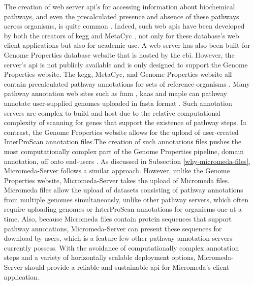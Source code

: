 The creation of web server \gls{api}'s for accessing information about 
biochemical pathways, and even the precalculated presence and absence of these 
pathways across organisms, is quite common 
\cite{wu2006kobas,moriya2010pathpred,pireddu2006path,vallenet2009microscope,aziz2008rast,takami2016automated,moriya2007kaas,chou2009fmm}. 
Indeed, such web \gls{api}s have been developed by both the creators of 
\gls{kegg} \cite{kawashima2003kegg} and MetaCyc \cite{karp2013data}, not only 
for these database's web client applications but also for academic use. A web 
server has also been built for Genome Properties database website 
\cite{richardson2018genome} that is hosted by the \gls{ebi}. However, the 
server's \gls{api} is not publicly available and is only designed to support the 
Genome Properties website. The \gls{kegg}, MetaCyc, and Genome Properties 
website all contain precalculated pathway annotations for sets of reference 
organisms \cite{kanehisa2000kegg,karp2002metacyc,karp2013data}. Many pathway 
annotation web sites such as \gls{fmm} \cite{chou2009fmm}, \gls{kaas} 
\cite{moriya2007kaas} and \gls{maple} \cite{takami2016automated} can pathway 
annotate user-supplied genomes uploaded in \gls{fasta} format 
\cite{pearson19905}. Such annotation servers are complex to build and host due 
to the relative computational complexity of scanning for genes that support the 
existence of pathway steps. In contrast, the Genome Properties website allows 
for the upload of user-created InterProScan annotation files.The creation of 
such annotations files pushes the most computationally complex part of the 
Genome Properties pipeline, domain annotation, off onto end-users 
\cite{richardson2018genome}. As discussed in Subsection 
\ref{why-micromeda-files}, Micromeda-Server follows a similar approach. However, 
unlike the Genome Properties website, Micromeda-Server takes the upload of 
Micromeda files. Micromeda files allow the upload of datasets consisting of 
pathway annotations from multiple genomes simultaneously, unlike other pathway 
servers, which often require uploading genomes or InterProScan annotations for 
organisms one at a time. Also, because Micromeda files contain protein sequences 
that support pathway annotations, Micromeda-Server can present these sequences 
for download by users, which is a feature few other pathway annotation servers 
currently possess. With the avoidance of computationally complex annotation 
steps and a variety of horizontally scalable deployment options, 
Micromeda-Server should provide a reliable and sustainable \gls{api} for 
Micromeda's client application.